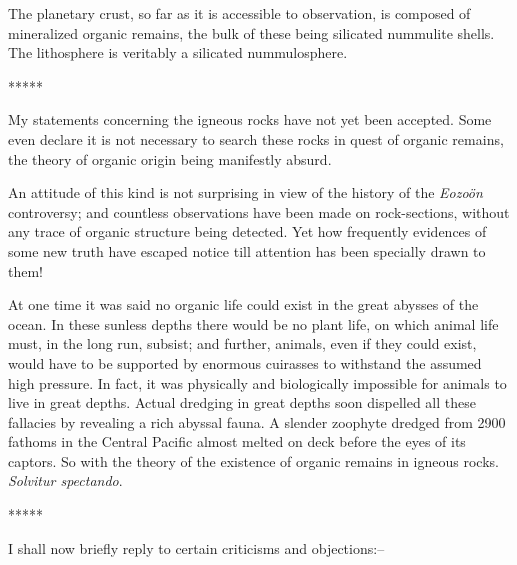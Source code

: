 \documentclass[a4paper, 12pt, oneside]{article}
\begin{document}
The planetary crust, so far as it is accessible to observation, is composed of mineralized organic remains, the bulk of these being silicated nummulite shells. The lithosphere is veritably a silicated nummulosphere.

\centerline{*\hspace{15mm}*\hspace{15mm}*\hspace{15mm}*\hspace{15mm}*}
\bigskip

My statements concerning the igneous rocks have not yet been accepted. Some even declare it is not necessary to search these rocks in quest of organic remains, the theory of organic origin being manifestly absurd.

An attitude of this kind is not surprising in view of the history of the \emph{Eozoön} controversy; and countless observations have been made on rock-sections, without any trace of organic structure being detected. Yet how frequently evidences of some new truth have escaped notice till attention has been specially drawn to them!

At one time it was said no organic life could exist in the great abysses of the ocean. In these sunless depths there would be no plant life, on which animal life must, in the long run, subsist; and further, animals, even if they could exist, would have to be supported by enormous cuirasses to withstand the assumed high pressure. In fact, it was physically and biologically impossible for animals to live in great depths. Actual dredging in great depths soon dispelled all these fallacies by revealing a rich abyssal fauna. A slender zoophyte dredged from 2900 fathoms in the Central Pacific almost melted on deck before the eyes of its captors. So with the theory of the existence of organic remains in igneous rocks. \emph{Solvitur spectando}.

\centerline{*\hspace{15mm}*\hspace{15mm}*\hspace{15mm}*\hspace{15mm}*}
\bigskip

I shall now briefly reply to certain criticisms and objections:--
\end{document}
